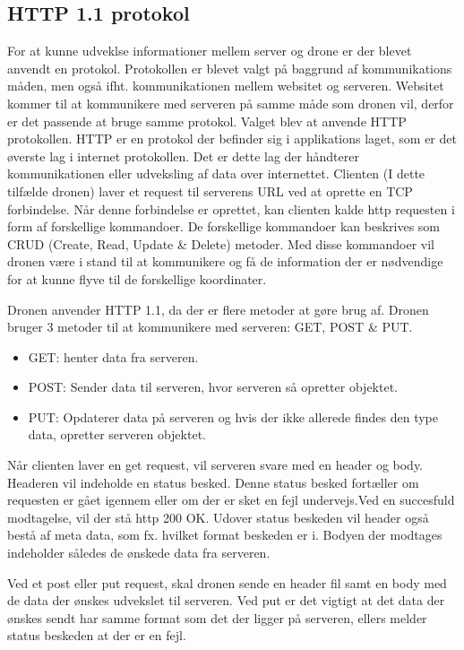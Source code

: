 \subsection{HTTP 1.1 protokol}

For at kunne udveklse informationer mellem server og drone er der blevet anvendt en protokol. Protokollen er blevet valgt på baggrund af kommunikations måden, men også ifht. kommunikationen mellem websitet og serveren. Websitet kommer til at kommunikere med serveren på samme måde som dronen vil, derfor er det passende at bruge samme protokol. 
Valget blev at anvende HTTP protokollen. HTTP er en protokol der befinder sig i applikations laget, som er det øverste lag i internet protokollen. Det er dette lag der håndterer kommunikationen eller udveksling af data over internettet. 
Clienten (I dette tilfælde dronen) laver et request til serverens URL ved at oprette en TCP forbindelse. Når denne forbindelse er oprettet, kan clienten kalde http requesten i form af forskellige kommandoer. De forskellige kommandoer kan beskrives som CRUD (Create, Read, Update \& Delete) metoder. 
Med disse kommandoer vil dronen være i stand til at kommunikere og få de information der er nødvendige for at kunne flyve til de forskellige koordinater.

Dronen anvender HTTP 1.1, da der er flere metoder at gøre brug af. 
Dronen bruger 3 metoder til at kommunikere med serveren: GET, POST \& PUT. 
\begin{itemize}
	\item GET: henter data fra serveren.
	\item POST: Sender data til serveren, hvor serveren så opretter objektet.
	\item PUT: Opdaterer data på serveren og hvis der ikke allerede findes den type data, opretter serveren objektet.
\end{itemize}

Når clienten laver en get request, vil serveren svare med en header og body. Headeren vil indeholde en status besked. Denne status besked fortæller om requesten er gået igennem eller om der er sket en fejl undervejs.Ved en succesfuld modtagelse, vil der stå http 200 OK. Udover status beskeden vil header også bestå af meta data, som fx. hvilket format beskeden er i. 
Bodyen der modtages indeholder således de ønskede data fra serveren.

Ved et post eller put request, skal dronen sende en header fil samt en body med de data der ønskes udvekslet til serveren. 
Ved put er det vigtigt at det data der ønskes sendt har samme format som det der ligger på serveren, ellers melder status beskeden at der er en fejl. 




